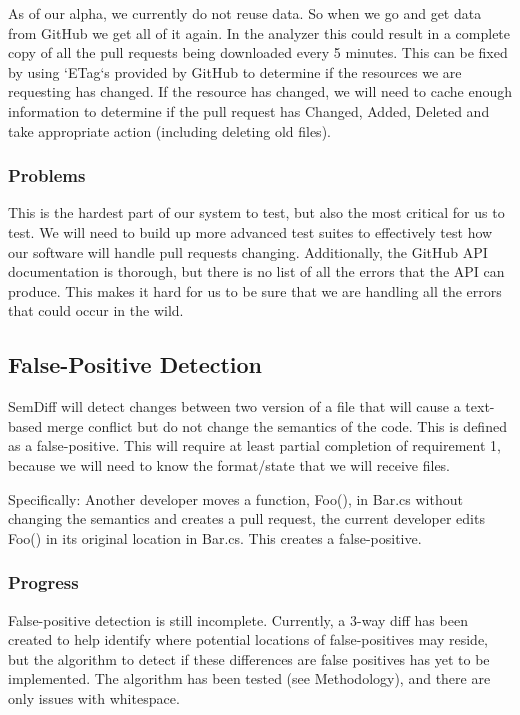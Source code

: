 \documentclass[10pt,draftclsnofoot,onecolumn]{IEEEtran}
\begin{document}
As of our alpha, we currently do not reuse data. So when we go and get data from GitHub we get all of it again. In the analyzer this could result in a complete copy of all the pull requests being downloaded every 5 minutes. This can be fixed by using `ETag`s provided by GitHub to determine if the resources we are requesting has changed. If the resource has changed, we will need to cache enough information to determine if the pull request has Changed, Added, Deleted and take appropriate action (including deleting old files).

\subsubsection{Problems}
This is the hardest part of our system to test, but also the most critical for us to test. We will need to build up more advanced test suites to effectively test how our software will handle pull requests changing.
Additionally, the GitHub API documentation is thorough, but there is no list of all the errors that the API can produce. This makes it hard for us to be sure that we are handling all the errors that could occur in the wild.

\subsection{False-Positive Detection}
SemDiff will detect changes between two version of a file that will cause a text-based merge conflict but do not change the semantics of the code. This is defined as a false-positive. This will require at least partial completion of requirement 1, because we will need to know the format/state that we will receive files.

Specifically: Another developer moves a function, Foo(), in Bar.cs without changing the semantics and creates a pull request, the current developer edits Foo() in its original location in Bar.cs. This creates a false-positive.

\subsubsection{Progress}
False-positive detection is still incomplete. Currently, a 3-way diff has been created to help identify where potential locations of false-positives may reside, but the algorithm to detect if these differences are false positives has yet to be implemented. The algorithm has been tested (see Methodology), and there are only issues with whitespace.
\end{document}
